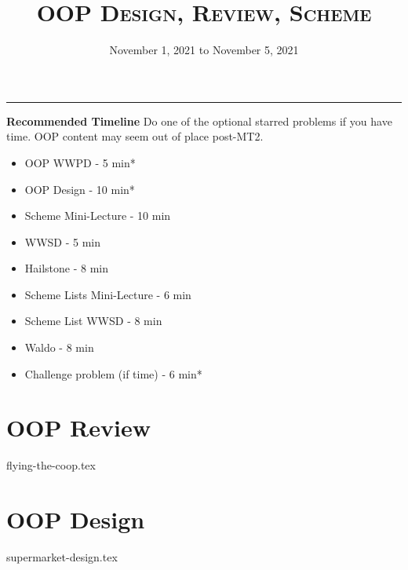 \documentclass{exam}
\title{\textsc{OOP Design, Review, Scheme}}
\date{November 1, 2021 to November 5, 2021}
\begin{document}
\maketitle
\rule{\textwidth}{0.15em}
\fontsize{12}{15}\selectfont

\begin{guide}
\begin{blocksection}
\textbf{Recommended Timeline}
Do one of the optional starred problems if you have time. OOP content may seem
out of place post-MT2.
\begin{itemize}
  \item OOP WWPD - 5 min*
  \item OOP Design - 10 min*
  \item Scheme Mini-Lecture - 10 min
  \item WWSD - 5 min
  \item Hailstone - 8 min
  \item Scheme Lists Mini-Lecture - 6 min
  \item Scheme List WWSD - 8 min
  \item Waldo - 8 min
  \item Challenge problem (if time) - 6 min*
\end{itemize}
\end{blocksection}
\end{guide}

\section{OOP Review}
\begin{questions}
{flying-the-coop.tex}
\end{questions}


\section{OOP Design}
\begin{questions}
{supermarket-design.tex}
\end{questions}
\newpage
\end{document}
